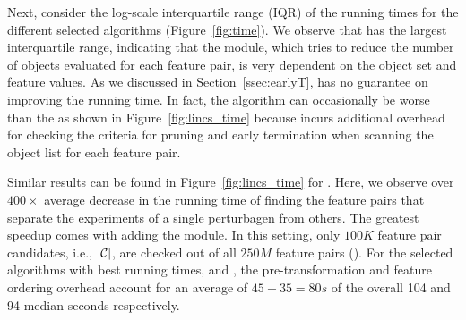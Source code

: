 Next, consider the log-scale interquartile range (IQR) of the running times for the different selected algorithms (Figure~\ref{fig:time}). We observe that \earlyOrder has the largest interquartile range, indicating that the \earlyT module, which tries to reduce the number of objects evaluated for each feature pair, is very dependent on the object set and feature values. As we discussed in Section~\ref{ssec:earlyT}, \earlyT has no guarantee on improving the running time. In fact, the algorithm can occasionally be worse than the \baseline as shown in Figure~\ref{fig:lincs_time} because \earlyT incurs additional overhead for checking the criteria for pruning and early termination when scanning the object list for each feature pair.

Similar results can be found in Figure~\ref{fig:lincs_time} for \lincs. Here, we observe over $400\times$ average decrease in the running time of finding the \topk feature pairs that separate the \lincs experiments of a single perturbagen from others. The greatest speedup comes with adding the \sampling module. In this setting, only $100K$ feature pair candidates, i.e., $|{\mathcal{C}}|$, are checked out of all $250M$ feature pairs (\timetbl). For the selected algorithms with best running times, \horiz and \vertic, the pre-transformation and feature ordering overhead account for an average of $45+35=80s$ of the overall 104 and 94 median seconds respectively.



